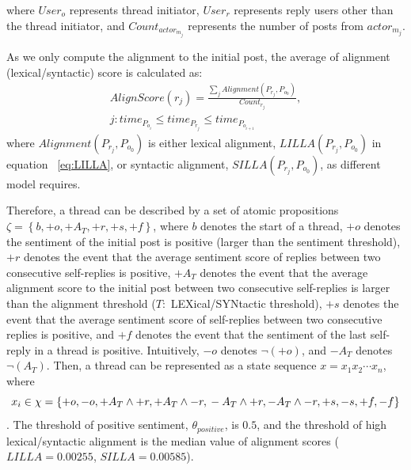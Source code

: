 \documentclass[man,biblatex,floatsintext]{apa6}
\begin{document}
where $User_{o}$ represents thread initiator, $User_{r}$ represents reply users other than the thread initiator, and $Count_{actor_{m_j}}$ represents the number of posts from $actor_{m_{j}}$.

As we only compute the alignment to the initial post, the average of alignment (lexical/syntactic) score is calculated as:
\begin{equation}
\begin{split}
AlignScore(r_{j})= \frac{\sum_{j} Alignment(P_{r_{j}},P_{o_{0}})}{Count_{r_{j}}},\\ j:time_{P_{o_{i}}} \leq time_{P_{r_{j}}} \leq time_{P_{o_{i+1}}}
\end{split}
\end{equation}
where $Alignment(P_{r_{j}},P_{o_{0}})$ is either lexical alignment, $LILLA(P_{r_{j}},P_{o_{0}})$ in equation ~\ref{eq:LILLA}, or syntactic alignment, $SILLA(P_{r_{j}},P_{o_{0}})$, as different model requires.


Therefore, a thread can be described by a set of atomic propositions $\zeta=\left \{b, +o, +A_T, +r, +s, +f \right \}$, where $b$ denotes the start of a thread, $+o$ denotes the sentiment of the initial post is positive (larger than the sentiment threshold), $+r$ denotes the event that the average sentiment score of replies between two consecutive self-replies is positive, $+A_T$ denotes the event that the average alignment score to the initial post between two consecutive self-replies is larger than the alignment threshold ($T:$ LEXical/SYNtactic threshold), $+s$ denotes the event that the average sentiment score of self-replies between two consecutive replies is positive, and $+f$ denotes the event that the sentiment of the last self-reply in a thread is positive. Intuitively, $-o$ denotes $\neg(+o)$, and $-A_T$ denotes $\neg(A_T)$. Then, a thread can be represented as a state sequence $x=x_{1}x_{2} \cdots x_{n}$, where
\begin{dmath}
x_i \in \chi = \left \{+o, -o, +A_T\wedge+r, +A_T\wedge-r, \\ -A_T\wedge+r, -A_T\wedge-r, +s, -s, +f, -f \right \}
\end{dmath}.
The threshold of positive sentiment, $\theta_{positive}$, is $0.5$, and the threshold of high lexical/syntactic alignment is the median value of alignment scores ($LILLA = 0.00255$, $SILLA = 0.00585$).
\end{document}
